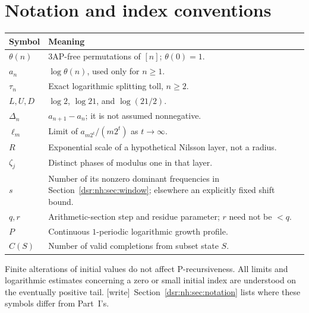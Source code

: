 \documentclass[11pt,a4paper]{article}
\numberwithin{equation}{section}
\theoremstyle{definition}
\theoremstyle{remark}
\newcommand{\wtag}{\textup{[write]}}
\newcommand{\tht}{\theta}
\theoremstyle{definition}
\theoremstyle{plain}
\begin{document}
\section{Notation and index conventions}
\label{dsr:nh:app:notation}
\begin{center}\small
\begin{tabularx}{\linewidth}{@{}l>{\raggedright\arraybackslash}X@{}}
\toprule
Symbol & Meaning\\
\midrule
$\tht(n)$ & 3AP-free permutations of $[n]$; $\tht(0)=1$.\\
$a_n$ & $\log\tht(n)$, used only for $n\ge1$.\\
$\tau_n$ & Exact logarithmic splitting toll, $n\ge2$.\\
$L,U,D$ & $\log2$, $\log21$, and $\log(21/2)$.\\
$\Delta_n$ & $a_{n+1}-a_n$; it is not assumed nonnegative.\\
$\ell_m$ & Limit of $a_{m2^t}/(m2^t)$ as $t\to\infty$.\\
$R$ & Exponential scale of a hypothetical Nilsson layer, not a radius.\\
$\zeta_j$ & Distinct phases of modulus one in that layer.\\
$s$ & Number of its nonzero dominant frequencies in Section~\ref{dsr:nh:sec:window};
 elsewhere an explicitly fixed shift bound.\\
$q,r$ & Arithmetic-section step and residue parameter; $r$ need not be $<q$.\\
$P$ & Continuous $1$-periodic logarithmic growth profile.\\
$C(S)$ & Number of valid completions from subset state $S$.\\
\bottomrule
\end{tabularx}
\end{center}
Finite alterations of initial values do not affect P-recursiveness. All
limits and logarithmic estimates concerning a zero or small initial index
are understood on the eventually positive tail.
\wtag\ Section~\ref{dsr:nh:sec:notation} lists where these symbols differ
from Part~I's.
\end{document}
